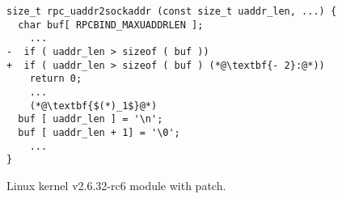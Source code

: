\begin{figure}
\centering
\begin{lstlisting}
size_t rpc_uaddr2sockaddr (const size_t uaddr_len, ...) {
  char buf[ RPCBIND_MAXUADDRLEN ];
    ...
-  if ( uaddr_len > sizeof ( buf ))
+  if ( uaddr_len > sizeof ( buf ) (*@\textbf{- 2}:@*))
    return 0;
    ...
    (*@\textbf{$(*)_1$}@*)
  buf [ uaddr_len ] = '\n';
  buf [ uaddr_len + 1] = '\0';
    ...
}
\end{lstlisting}
\caption{Linux kernel  v2.6.32-rc6 module with patch.}
\end{figure} 